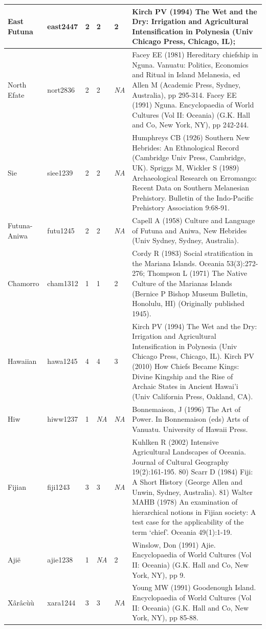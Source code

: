 \documentclass[draft,10pt]{article} %
\begin{document}
\begin{landscape}
\begin{longtable}{ | p{2cm}| p{2cm}| p{1.8cm}| p{1.8cm}| p{3cm}| p{9cm}| }
East Futuna&east2447&2&2&2&Kirch PV (1994) The Wet and the Dry: Irrigation and Agricultural Intensification in Polynesia (Univ Chicago Press, Chicago, IL);\\ \hline
North Efate&nort2836&2&2&\emph{NA}&Facey EE (1981) Hereditary chiefship in Nguna. Vanuatu: Politics, Economics and Ritual in Island Melanesia, ed Allen M (Academic Press, Sydney, Australia), pp 295-314. Facey EE (1991) Nguna. Encyclopaedia of World Cultures (Vol II: Oceania) (G.K. Hall and Co, New York, NY), pp 242-244. \\ \hline
Sie&siee1239&2&2&\emph{NA}&Humphreys CB (1926) Southern New Hebrides: An Ethnological Record (Cambridge Univ Press, Cambridge, UK). Spriggs M, Wickler S (1989) Archaeological Research on Erromango: Recent Data on Southern Melanesian Prehistory. Bulletin of the Indo-Pacific Prehistory Association 9:68-91.\\ \hline
Futuna-Aniwa&futu1245&2&2&\emph{NA}&Capell A (1958) Culture and Language of Futuna and Aniwa, New Hebrides (Univ Sydney, Sydney, Australia).\\ \hline
Chamorro&cham1312&1&1&2&Cordy R (1983) Social stratification in the Mariana Islands. Oceania 53(3):272-276; Thompson L (1971) The Native Culture of the Marianas Islands (Bernice P Bishop Museum Bulletin, Honolulu, HI) (Originally published 1945). \\ \hline
Hawaiian&hawa1245&4&4&3&Kirch PV (1994) The Wet and the Dry: Irrigation and Agricultural Intensification in Polynesia (Univ Chicago Press, Chicago, IL). Kirch PV (2010) How Chiefs Became Kings: Divine Kingship and the Rise of Archaic States in Ancient Hawai'i (Univ California Press, Oakland, CA).\\ \hline
Hiw&hiww1237&1&\emph{NA}&\emph{NA}&Bonnemaison, J (1996) The Art of Power. In Bonnemaison (eds) Arts of Vanuatu. University of Hawaii Press.\\ \hline
Fijian&fiji1243&3&3&\emph{NA}&Kuhlken R (2002) Intensive Agricultural Landscapes of Oceania. Journal of Cultural Geography 19(2):161-195. 80) Scarr D (1984) Fiji: A Short History (George Allen and Unwin, Sydney, Australia). 81) Walter MAHB (1978) An examination of hierarchical notions in Fijian society: A test case for the applicability of the term ‘chief’. Oceania 49(1):1-19. \\ \hline
Ajië&ajie1238&1&\emph{NA}&2&Winslow, Don (1991) Ajie. Encyclopaedia of World Cultures (Vol II: Oceania) (G.K. Hall and Co, New York, NY), pp 9.\\ \hline
Xârâcùù&xara1244&3&3&\emph{NA}&Young MW (1991) Goodenough Island. Encyclopaedia of World Cultures (Vol II: Oceania) (G.K. Hall and Co, New York, NY), pp 85-88.\\ \hline

\end{longtable}
\end{landscape}
\end{document}
